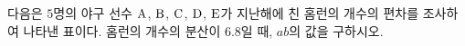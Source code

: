 다음은 $5$명의 야구 선수 $\mathrm{A}$, $\mathrm{B}$, $\mathrm{C}$, $\mathrm{D}$, $\mathrm{E}$가 지난해에 친 홈런의 개수의 편차를 조사하여 나타낸 표이다. 홈런의 개수의 분산이 $6.8$일 때, $ab$의 값을 구하시오.
\par\smallskip\begin{center}\resizebox{\ifdim\width>\linewidth\linewidth\else\width\fi}{!}{}\end{center}
